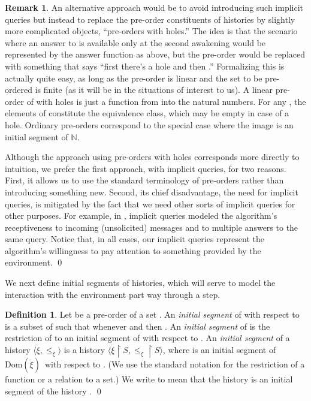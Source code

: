 \documentclass{LMCS}
\theoremstyle{definition}
\newtheorem{df}[thm]{Definition}
\newtheorem{rmk}[thm]{Remark}
\newcommand{\ans}{\dot}
\newcommand{\bbb}[1]{\ensuremath{\mathbb {#1}}}
\newcommand{\dom}[1]{\ensuremath{{\text{Dom}}(#1)}}
\newcommand{\restr}{\mathop{\upharpoonright}}
\newcommand{\sq}[1]{\ensuremath{\langle#1\rangle}}
\begin{document}
\begin{rmk}
An alternative approach would be to avoid introducing such implicit
queries but instead to replace the pre-order constituents of histories
by slightly more complicated objects, ``pre-orders with holes.''  The
idea is that the scenario where an answer to  is available only at
the second awakening would be represented by the answer function
 as above, but the pre-order would be replaced with
something that says ``first there's a hole and then .''
Formalizing this is actually quite easy, as long as the pre-order is
linear and the set  to be pre-ordered is finite (as it will be in
the situations of interest to us).  A linear pre-order of  with
holes is just a function  from  into the natural numbers.
For any , the elements of  constitute the 
equivalence class, which may be empty in case of a hole.  Ordinary
pre-orders correspond to the special case where the image  is an
initial segment of \bbb N.

Although the approach using pre-orders with holes corresponds more
directly to intuition, we prefer the first approach, with implicit
queries, for two reasons.  First, it allows us to use the standard
terminology of pre-orders rather than introducing something new.
Second, its chief disadvantage, the need for implicit queries, is
mitigated by the fact that we need other sorts of implicit queries for
other purposes.  For example, in \cite[Section~2]{oa1}, implicit
queries modeled the algorithm's receptiveness to incoming
(unsolicited) messages and to multiple answers to the same query.
Notice that, in all cases, our implicit queries represent the
algorithm's willingness to pay attention to something provided by the
environment.
\qed\end{rmk}

We next define initial segments of histories, which will serve to
model the interaction with the environment part way through a step.

\begin{df}
Let  be a pre-order of a set .  An \emph{initial segment} of
 with respect to  is a subset  of  such that whenever
 and  then .  An \emph{initial segment} of
 is the restriction of  to an initial segment of  with
respect to .  An \emph{initial segment} of a history
\sq{{\ans\xi},\leq_\xi} is a history \sq{{\ans\xi}\restr
S,\leq_\xi\restr S}, where  is an initial segment of \dom{\ans\xi}\ with
respect to .  (We use the standard notation  for the
restriction of a function or a relation to a set.)  We write
 to mean that the history  is an initial segment
of the history .
\qed\end{df}
\end{document}
